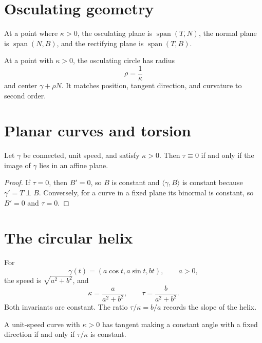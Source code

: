 \section{Osculating geometry}
\begin{definition}\label{def:vii13-planes}
At a point where \(\kappa>0\), the osculating plane is \(\operatorname{span}(T,N)\), the normal plane is \(\operatorname{span}(N,B)\), and the rectifying plane is \(\operatorname{span}(T,B)\).
\end{definition}

\begin{proposition}\label{prop:vii13-osculating-circle}
At a point with \(\kappa>0\), the osculating circle has radius
\[
\rho=\frac1\kappa
\]
and center \(\gamma+\rho N\).  It matches position, tangent direction, and curvature to second order.
\end{proposition}

\section{Planar curves and torsion}
\begin{theorem}\label{thm:vii13-planarity}
Let \(\gamma\) be connected, unit speed, and satisfy \(\kappa>0\).  Then \(\tau\equiv0\) if and only if the image of \(\gamma\) lies in an affine plane.
\end{theorem}
\begin{proof}
If \(\tau=0\), then \(B'=0\), so \(B\) is constant and \(\langle\gamma,B\rangle\) is constant because \(\gamma'=T\perp B\).  Conversely, for a curve in a fixed plane its binormal is constant, so \(B'=0\) and \(\tau=0\).
\end{proof}

\section{The circular helix}
\begin{example}[Helix]\label{ex:vii13-helix}
For
\[
\gamma(t)=(a\cos t,a\sin t,bt),\qquad a>0,
\]
the speed is \(\sqrt{a^2+b^2}\), and
\[
\kappa=\frac{a}{a^2+b^2},\qquad
\tau=\frac{b}{a^2+b^2}.
\]
Both invariants are constant.  The ratio \(\tau/\kappa=b/a\) records the slope of the helix.
\end{example}

\begin{theorem}\label{thm:vii13-general-helix}
A unit-speed curve with \(\kappa>0\) has tangent making a constant angle with a fixed direction if and only if \(\tau/\kappa\) is constant.
\end{theorem}

